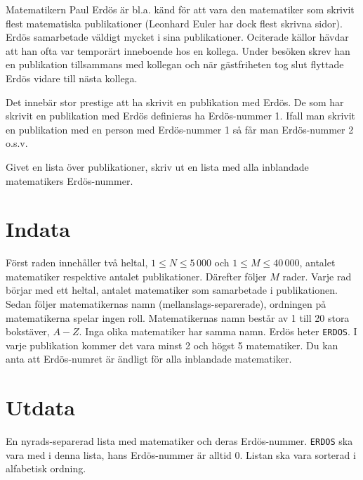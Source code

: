 
Matematikern Paul Erdös är bl.a. känd för att vara den matematiker som skrivit flest matematiska publikationer (Leonhard Euler har dock flest skrivna sidor). Erdös samarbetade väldigt mycket i sina publikationer. Ociterade källor hävdar att han ofta var temporärt inneboende hos en kollega. Under besöken skrev han en publikation tillsammans med kollegan och när gästfriheten tog slut flyttade Erdös vidare till nästa kollega.

Det innebär stor prestige att ha skrivit en publikation med Erdös. De som har skrivit en publikation med Erdös definieras ha Erdös-nummer 1. Ifall man skrivit en publikation med en person med Erdös-nummer 1 så får man Erdös-nummer 2 o.s.v.

Givet en lista över publikationer, skriv ut en lista med alla inblandade matematikers Erdös-nummer.
\section{Indata}

Först raden innehåller två heltal, $1 \le N \le 5\,000$ och $1 \le M \le 40\,000$, antalet matematiker respektive antalet publikationer. Därefter följer $M$ rader. Varje rad börjar med ett heltal, antalet matematiker som samarbetade i publikationen. Sedan följer matematikernas namn (mellanslags-separerade), ordningen på matematikerna spelar ingen roll. Matematikernas namn består av 1 till 20 stora bokstäver, $A - Z$. Inga olika matematiker har samma namn. Erdös heter \texttt{ERDOS}. I varje publikation kommer det vara minst 2 och högst 5 matematiker. Du kan anta att Erdös-numret är ändligt för alla inblandade matematiker.
\section{Utdata}

En nyrads-separerad lista med matematiker och deras Erdös-nummer. \texttt{ERDOS} ska vara med i denna lista, hans Erdös-nummer är alltid 0. Listan ska vara sorterad i alfabetisk ordning. 
